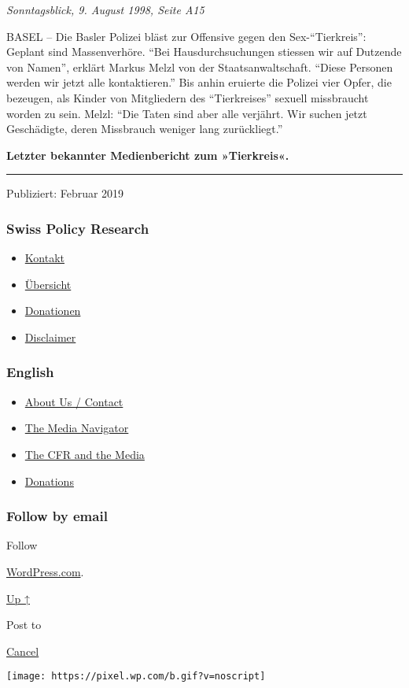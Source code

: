 \emph{Sonntagsblick, 9. August 1998, Seite A15}

BASEL -- Die Basler Polizei bläst zur Offensive gegen den
Sex-``Tierkreis'': Geplant sind Massenverhöre. ``Bei Hausdurchsuchungen
stiessen wir auf Dutzende von Namen'', erklärt Markus Melzl von der
Staats­an­walt­schaft. ``Diese Personen werden wir jetzt alle
kontaktieren.'' Bis anhin eruierte die Polizei vier Opfer, die bezeugen,
als Kinder von Mitgliedern des ``Tierkreises'' sexuell missbraucht
worden zu sein. Melzl: ``Die Taten sind aber alle verjährt. Wir suchen
jetzt Geschädigte, deren Missbrauch weniger lang zurückliegt.''

\textbf{Letzter bekannter Medienbericht zum »Tierkreis«.}

\begin{center}\rule{0.5\linewidth}{\linethickness}\end{center}

Publiziert: Februar 2019

\hypertarget{swiss-policy-research}{%
\subsubsection{Swiss Policy Research}\label{swiss-policy-research}}

\begin{itemize}
\tightlist
\item
  \href{https://swprs.org/kontakt/}{Kontakt}
\item
  \href{https://swprs.org/uebersicht/}{Übersicht}
\item
  \href{https://swprs.org/donationen/}{Donationen}
\item
  \href{https://swprs.org/disclaimer/}{Disclaimer}
\end{itemize}

\hypertarget{english}{%
\subsubsection{English}\label{english}}

\begin{itemize}
\tightlist
\item
  \href{https://swprs.org/contact/}{About Us / Contact}
\item
  \href{https://swprs.org/media-navigator/}{The Media Navigator}
\item
  \href{https://swprs.org/the-american-empire-and-its-media/}{The CFR
  and the Media}
\item
  \href{https://swprs.org/donations/}{Donations}
\end{itemize}

\hypertarget{follow-by-email}{%
\subsubsection{Follow by email}\label{follow-by-email}}

Follow

\href{https://wordpress.com/?ref=footer_custom_com}{WordPress.com}.

\protect\hyperlink{}{Up ↑}

Post to

\protect\hyperlink{}{Cancel}

\texttt{[image: https://pixel.wp.com/b.gif?v=noscript]}
